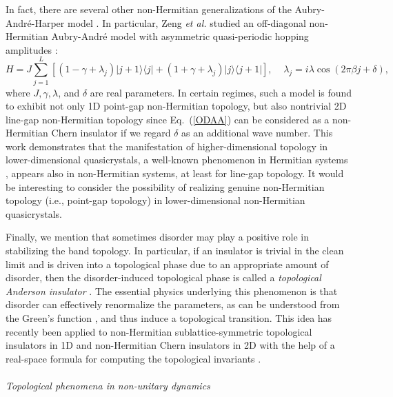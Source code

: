 \documentclass{tADP2e}
\theoremstyle{plain}
\theoremstyle{plain}
\theoremstyle{definition}
\begin{document}
In fact, there are several other non-Hermitian generalizations of the Aubry-Andr\'e-Harper model \cite{CY14,HAK16,ZQB20}. In particular, Zeng \emph{et al.} studied an off-diagonal non-Hermitian Aubry-Andr\'e model with asymmetric quasi-periodic hopping amplitudes \cite{ZQB20}:
\begin{equation}
H=J\sum^L_{j=1}[(1-\gamma+\lambda_j)|j+1\rangle\langle j|+(1+\gamma+\lambda_j)|j\rangle\langle j+1|],\;\;\;\;\lambda_j=i\lambda\cos(2\pi\beta j+\delta),
\label{ODAA}
\end{equation}
where $J,\gamma,\lambda$, and $\delta$ are real parameters. In certain regimes, such a model is found to exhibit not only 1D point-gap non-Hermitian topology, but also nontrivial 2D line-gap non-Hermitian topology since Eq.~(\ref{ODAA}) can be considered as a non-Hermitian Chern insulator if we regard $\delta$ as an additional wave number. This work demonstrates that the manifestation of higher-dimensional topology in lower-dimensional quasicrystals, a well-known phenomenon in Hermitian systems \cite{KYE12,LLJ12,GS13,PE15}, appears also in non-Hermitian systems, at least for line-gap topology. It would be interesting to consider the possibility of realizing genuine non-Hermitian topology (i.e., point-gap topology) in lower-dimensional non-Hermitian quasicrystals. 


Finally, we mention that sometimes disorder may play a positive role in stabilizing the band topology. In particular, if an insulator is trivial in the clean limit and is driven into a topological phase due to an appropriate amount of disorder, then the disorder-induced topological phase is called a \emph{topological Anderson insulator} \cite{LJ09,GCW09,JH09,GHM10}. The essential physics underlying this phenomenon is that disorder can effectively renormalize the parameters, as can be understood from the Green's function \cite{GCW09,JH09,GHM10}, and thus induce a topological transition. This idea has recently been applied to non-Hermitian sublattice-symmetric topological insulators in 1D \cite{XWL19,DWZ20} %
and non-Hermitian Chern insulators in 2D \cite{LZT20}%
with the help of a real-space formula for computing the topological invariants \cite{SF19b}. 
\\ \\ {\it Topological phenomena in non-unitary dynamics} 
\end{document}
